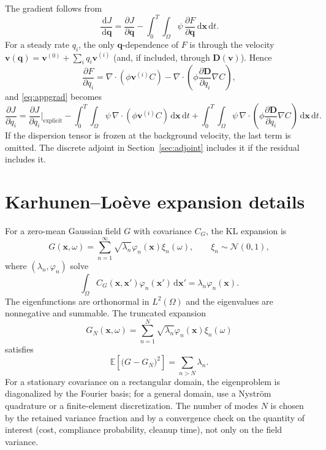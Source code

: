 \documentclass[11pt]{article}
\numberwithin{equation}{section}
\newcommand{\E}{\mathbb{E}}
\newcommand{\dd}{\,\mathrm{d}}
\newcommand{\pdd}[2]{\frac{\partial #1}{\partial #2}}
\newcommand{\xx}{\mathbf{x}}
\newcommand{\vv}{\mathbf{v}}
\newcommand{\DD}{\mathbf{D}}
\theoremstyle{plain}
\begin{document}
The gradient follows from
\begin{equation}
\label{eq:appgrad}
\frac{\dd J}{\dd\mathbf{q}}
=\pdd{J}{\mathbf{q}}
-\int_0^T\int_\Omega\psi\,\pdd{F}{\mathbf{q}}\dd\xx\dd t.
\end{equation}
For a steady rate $q_i$, the only $\mathbf{q}$-dependence of $F$ is through the
velocity $\vv(\mathbf{q})=\vv^{(0)}+\sum_iq_i\vv^{(i)}$ (and, if included,
through $\DD(\vv)$).  Hence
\begin{equation}
\label{eq:appgrad2}
\pdd{F}{q_i}
=\nabla\cdot(\phi\vv^{(i)}C)
-\nabla\cdot\left(\phi\pdd{\DD}{q_i}\nabla C\right),
\end{equation}
and \eqref{eq:appgrad} becomes
\begin{equation}
\label{eq:appgrad3}
\pdd{J}{q_i}
=\pdd{J}{q_i}\bigg|_{\text{explicit}}
-\int_0^T\int_\Omega\psi\,\nabla\cdot(\phi\vv^{(i)}C)\dd\xx\dd t
+\int_0^T\int_\Omega\psi\,\nabla\cdot\left(\phi\pdd{\DD}{q_i}\nabla C\right)
\dd\xx\dd t.
\end{equation}
If the dispersion tensor is frozen at the background velocity, the last term
is omitted.  The discrete adjoint in Section~\ref{sec:adjoint} includes it if
the residual includes it.

\section{Karhunen--Lo\`eve expansion details}
\label{app:kl}

For a zero-mean Gaussian field $G$ with covariance $C_G$, the KL expansion is
\begin{equation}
\label{eq:appkl}
G(\xx,\omega)=\sum_{n=1}^{\infty}\sqrt{\lambda_n}\varphi_n(\xx)\xi_n(\omega),
\qquad
\xi_n\sim\mathcal{N}(0,1),
\end{equation}
where $(\lambda_n,\varphi_n)$ solve
\begin{equation}
\label{eq:appklgen}
\int_\Omega C_G(\xx,\xx')\varphi_n(\xx')\dd\xx'
=\lambda_n\varphi_n(\xx).
\end{equation}
The eigenfunctions are orthonormal in $L^2(\Omega)$ and the eigenvalues are
nonnegative and summable.  The truncated expansion
\begin{equation}
\label{eq:appkltrunc}
G_{N}(\xx,\omega)=\sum_{n=1}^{N}\sqrt{\lambda_n}\varphi_n(\xx)\xi_n(\omega)
\end{equation}
satisfies
\begin{equation}
\label{eq:appklvar}
\E\left[\bigl(G-G_N\bigr)^2\right]=\sum_{n>N}\lambda_n.
\end{equation}
For a stationary covariance on a rectangular domain, the eigenproblem is
diagonalized by the Fourier basis; for a general domain, use a Nystr\"om
quadrature or a finite-element discretization.  The number of modes $N$ is
chosen by the retained variance fraction and by a convergence check on the
quantity of interest (cost, compliance probability, cleanup time), not only on
the field variance.
\end{document}
